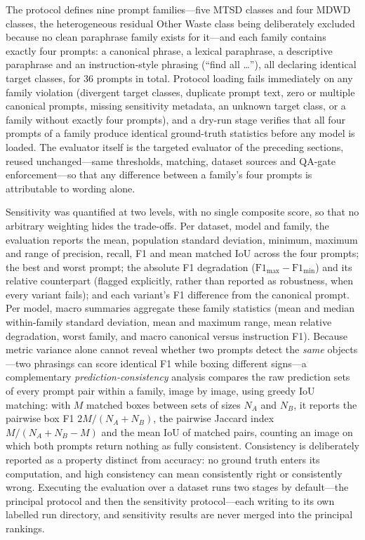 The protocol defines nine prompt families---five MTSD classes and four MDWD classes, the heterogeneous residual Other Waste class being deliberately excluded because no clean paraphrase family exists for it---and each family contains exactly four prompts: a canonical phrase, a lexical paraphrase, a descriptive paraphrase and an instruction-style phrasing (``find all \ldots''), all declaring identical target classes, for 36 prompts in total. Protocol loading fails immediately on any family violation (divergent target classes, duplicate prompt text, zero or multiple canonical prompts, missing sensitivity metadata, an unknown target class, or a family without exactly four prompts), and a dry-run stage verifies that all four prompts of a family produce identical ground-truth statistics before any model is loaded. The evaluator itself is the targeted evaluator of the preceding sections, reused unchanged---same thresholds, matching, dataset sources and QA-gate enforcement---so that any difference between a family's four prompts is attributable to wording alone.

Sensitivity was quantified at two levels, with no single composite score, so that no arbitrary weighting hides the trade-offs. Per dataset, model and family, the evaluation reports the mean, population standard deviation, minimum, maximum and range of precision, recall, F1 and mean matched IoU across the four prompts; the best and worst prompt; the absolute F1 degradation ($\mathrm{F1}_{\max} - \mathrm{F1}_{\min}$) and its relative counterpart (flagged explicitly, rather than reported as robustness, when every variant fails); and each variant's F1 difference from the canonical prompt. Per model, macro summaries aggregate these family statistics (mean and median within-family standard deviation, mean and maximum range, mean relative degradation, worst family, and macro canonical versus instruction F1). Because metric variance alone cannot reveal whether two prompts detect the \emph{same} objects---two phrasings can score identical F1 while boxing different signs---a complementary \emph{prediction-consistency} analysis compares the raw prediction sets of every prompt pair within a family, image by image, using greedy IoU matching: with $M$ matched boxes between sets of sizes $N_A$ and $N_B$, it reports the pairwise box F1 $2M/(N_A+N_B)$, the pairwise Jaccard index $M/(N_A+N_B-M)$ and the mean IoU of matched pairs, counting an image on which both prompts return nothing as fully consistent. Consistency is deliberately reported as a property distinct from accuracy: no ground truth enters its computation, and high consistency can mean consistently right or consistently wrong. Executing the evaluation over a dataset runs two stages by default---the principal protocol and then the sensitivity protocol---each writing to its own labelled run directory, and sensitivity results are never merged into the principal rankings.

